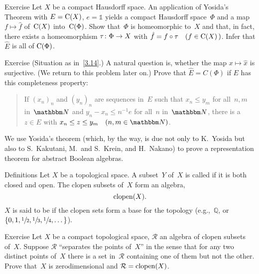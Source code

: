 \documentclass[main.tex]{subfiles}
\begin{document}
%
%
\begin{psec}{3.15}{Exercise}
Let $X$ be a compact Hausdorff space.
An application of Yosida's Theorem with $E=\mathrm{C}(X)$,
$e=\mathbb{1}$ yields
a compact Hausdorff space~$\Phi$
and a map $f\mapsto\hat{f}$ of~$\mathrm{C}(X)$ into~$\mathrm{C}(\Phi)$.
Show that~$\Phi$ is homeomorphic to~$X$
and that, in fact, there exists a homeomorphism
$\tau\colon \Phi\rightarrow X$ with $\hat{f}=f\circ \tau\quad(f\in \mathrm{C}(X)\, )$.
Infer that $\hat{E}$ is all of $\mathrm{C}(\Phi)$.
\end{psec}
%
%
\begin{psec}{3.16}{Exercise}
(Situation as in~\ref{3.14}.)
A natural question is,
whether the map $x\mapsto \hat{x}$ is surjective.
(We return to this problem later on.)
Prove that $\hat{E}=C(\Phi)$ if $E$ has this completeness property:
\begin{quote}
If $(x_n)_n$ and $(y_n)_n$ are sequences in~$E$
such that $x_n \leq y_m$ for all~$n,m$ in~$\N$
and $y_n-x_n\leq n^{-1} e$ for all~$n$ in~$\N$,
there is a~$z\in E$ with $x_n\leq z\leq y_m \quad (n,m\in \N)$.
\end{quote}
\end{psec}
%
%
We use Yosida's theorem
(which, by the way, 
is due not only to 
K.~Yosida
but also to 
S.~Kakutani,
M.~and S.~Krein,
and H.~Nakano)
to prove a representation theorem
for abstract Boolean algebras.
\begin{psec}{3.17}{Definitions}
Let $X$ be a topological space.
A subset~$Y$ of~$X$
is called  if it is both closed and open.
The clopen subsets of~$X$ form an algebra,
\begin{equation*}
\mathrm{clopen}(X)\text{.}
\end{equation*}
$X$ is said to be 
if the clopen sets form a base 
for the topology (e.g.,~$\mathbb{Q}$, 
or $\{0,1,\sfrac{1}{2},\sfrac{1}{3},\sfrac{1}{4},\dotsc\}$).
\end{psec}
%
%
\begin{psec}{3.18}{Exercise}
Let $X$ be a compact topological space,
$\mathcal{R}$ an algebra of clopen subsets of~$X$.
Suppose $\mathcal{R}$ ``separates the points of~$X$''
in the sense that for any two distinct points of~$X$
there is a set in~$\mathcal{R}$
containing one of them but not the other.
Prove that~$X$ is zerodimensional
and $\mathcal{R}=\mathrm{clopen}(X)$.
\end{psec}
%
%
\end{document}

